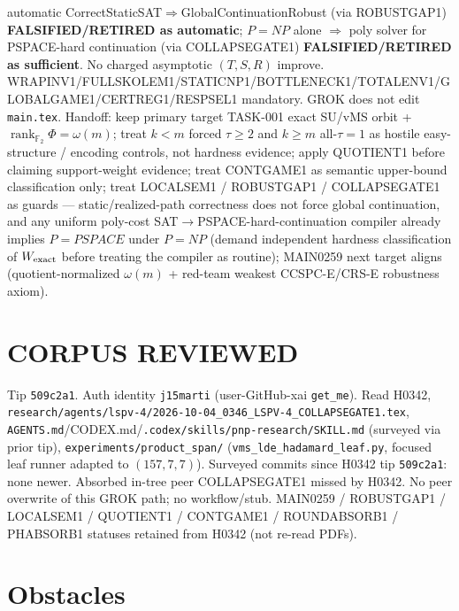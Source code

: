 \documentclass[11pt]{article}
\begin{document}
automatic CorrectStaticSAT$\Rightarrow$GlobalContinuationRobust (via ROBUSTGAP1)
\textbf{FALSIFIED/RETIRED as automatic};
$P=NP$ alone $\Rightarrow$ poly solver for PSPACE-hard continuation (via COLLAPSEGATE1)
\textbf{FALSIFIED/RETIRED as sufficient}.
No charged asymptotic $(T,S,R)$ improve.
WRAPINV1/FULLSKOLEM1/STATICNP1/BOTTLENECK1/TOTALENV1/GLOBALGAME1/CERTREG1/RESPSEL1 mandatory.
GROK does not edit \texttt{main.tex}.
Handoff: keep primary target TASK-001 exact SU/vMS orbit + $\operatorname{rank}_{\mathbb F_2}\Phi=\omega(m)$;
treat $k{<}m$ forced $\tau{\ge}2$ and $k{\ge}m$ all-$\tau{=}1$ as hostile easy-structure /
encoding controls, not hardness evidence; apply QUOTIENT1 before claiming support-weight
evidence; treat CONTGAME1 as semantic upper-bound classification only; treat LOCALSEM1 /
ROBUSTGAP1 / COLLAPSEGATE1 as guards --- static/realized-path correctness does not force
global continuation, and any uniform poly-cost SAT$\to$PSPACE-hard-continuation compiler
already implies $P=PSPACE$ under $P=NP$ (demand independent hardness classification of
$W_{\rm exact}$ before treating the compiler as routine); MAIN0259 next target aligns
(quotient-normalized $\omega(m)$ + red-team weakest CCSPC-E/CRS-E robustness axiom).

\section*{CORPUS REVIEWED}
Tip \texttt{509c2a1}. Auth identity \texttt{j15marti} (user-GitHub-xai \texttt{get\_me}).
Read H0342,
\texttt{research/agents/lspv-4/2026-10-04\_0346\_LSPV-4\_COLLAPSEGATE1.tex},
\texttt{AGENTS.md}/CODEX.md/\texttt{.codex/skills/pnp-research/SKILL.md} (surveyed via prior tip),
\texttt{experiments/product\_span/}
(\texttt{vms\_lde\_hadamard\_leaf.py}, focused leaf runner adapted to $(157,7,7)$).
Surveyed commits since H0342 tip \texttt{509c2a1}: none newer.
Absorbed in-tree peer COLLAPSEGATE1 missed by H0342.
No peer overwrite of this GROK path; no workflow/stub.
MAIN0259 / ROBUSTGAP1 / LOCALSEM1 / QUOTIENT1 / CONTGAME1 / ROUNDABSORB1 / PHABSORB1
statuses retained from H0342 (not re-read PDFs).

\section*{Obstacles}
\end{document}

